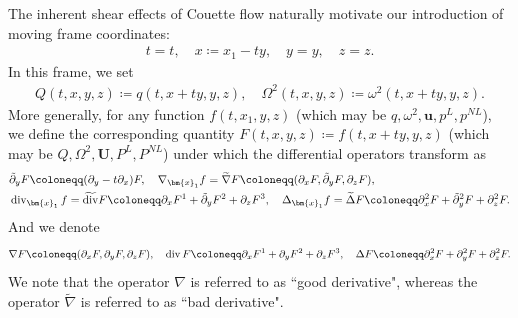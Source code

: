 \documentclass[11pt,reqno]{article}
\numberwithin{equation}{section}
\newcommand\x{\bm{x}}
\newcommand\uu{\bm{u}}
\newcommand\U{\bm{U}}
\newcommand \tri {\coloneqq}
\let\pa=\partial
\let\om=\omega
\def\dive{\mathop{\rm div}\nolimits}
\begin{document}
The inherent shear effects of Couette flow naturally motivate our introduction of moving frame coordinates:
\begin{align}\label{def-t1-x1-y1}
t= t,\quad x\tri x_1-ty,\quad y= y,\quad z=z.
\end{align}
In this frame, we set
\begin{align}\label{def-Q}
Q(t,x,y,z)\tri q(t,x+ty,y,z),
\quad 
\Omega^2(t,x,y,z)\tri \om^2(t,x+ty,y,z).
\end{align}
More generally, for any function $f(t,x_1,y,z)$ (which may be $q,\om^2,\uu,p^L,p^{NL}$), we define the corresponding quantity $F(t,x,y,z)\tri f(t,x+ty,y,z)$ (which may be $Q,\Omega^2,\U,P^L,P^{NL}$) under which the differential operators transform as	
\begin{align*}
&\tilde{\pa}_y F \tri (\pa_{y}-t\pa_{x})F,
\quad
\nabla_{\x_1}f=
\widetilde{\nabla}F \tri (\pa_{x}F,\tilde{\pa}_y F,\pa_{z}F),
\\
&\dive_{\x_1}f =
\widetilde{\dive}F \tri \pa_{x} F^1+\tilde{\pa}_y F^2+\pa_z F^3,
\quad
\Delta_{\x_1}f =
\widetilde{\Delta}F \tri \pa_{x}^2F+\tilde{\pa}_y^2F+\pa_z^2 F.
\end{align*}
And we denote 
\begin{align*}
\nabla F\tri (\pa_{x}F,\pa_{y}F,\pa_{z}F),
\quad \dive F\tri \pa_{x} F^1+\pa_{y}F^2+\pa_{z}F^3,
\quad \Delta F\tri \pa_{x}^2F+\pa_{y}^2F+\pa_{z}^2 F.
\end{align*}
We note that the operator $\nabla$ is referred  to as ``good derivative", whereas the operator $\widetilde{\nabla}$ is referred to as ``bad derivative".
\end{document}

